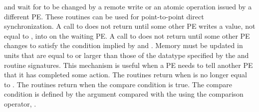 { 
         and  wait for  to be changed by a remote
       write or an atomic operation issued by a different \ac{PE}. 
       These  routines can be used for point-to-point direct synchronization.  A call to
        does not return until some other \ac{PE} writes  a value,
       not equal to , into  on the waiting \ac{PE}.  A call to
        does not return until some  other \ac{PE} changes
        to satisfy the condition implied by  and .  
       Memory must be updated in units that are equal to or larger than
       those of the datatype specified by the  and
        routine signatures.
       This mechanism is useful when a \ac{PE} needs to tell another \ac{PE}
       that it has completed some action.
       The   routines return when  is no  longer  equal  to
       . The  routines return when the compare condition is true.  The compare condition is defined by the   argument  compared
       with the  using the comparison operator, . 
  }
